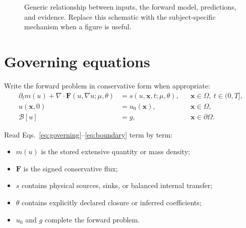 \documentclass[11pt]{article}
\newcommand{\vect}[1]{\bm{#1}}
\begin{document}
\begin{figure}[htbp]
\centering
{}
\caption{Generic relationship between inputs, the forward model, predictions, and evidence. Replace this schematic with the subject-specific mechanism when a figure is useful.}
\label{fig:concept}
\end{figure}

\section{Governing equations}

Write the forward problem in conservative form when appropriate:
\begin{align}
 \partial_t m(u)+\nabla\cdot\vect F(u,\nabla u;\mu,\theta)
 &=s(u,\vect x,t;\mu,\theta), && \vect x\in\Omega,\ t\in(0,T],
 \label{eq:governing}\\
 u(\vect x,0)&=u_0(\vect x), && \vect x\in\Omega,\label{eq:initial}\\
 \mathcal B[u]&=g, && \vect x\in\partial\Omega .\label{eq:boundary}
\end{align}

Read Eqs.~\eqref{eq:governing}--\eqref{eq:boundary} term by term:
\begin{itemize}[leftmargin=*]
 \item $m(u)$ is the stored extensive quantity or mass density;
 \item $\vect F$ is the signed conservative flux;
 \item $s$ contains physical sources, sinks, or balanced internal transfer;
 \item $\theta$ contains explicitly declared closure or inferred coefficients;
 \item $u_0$ and $g$ complete the forward problem.
\end{itemize}
\end{document}
